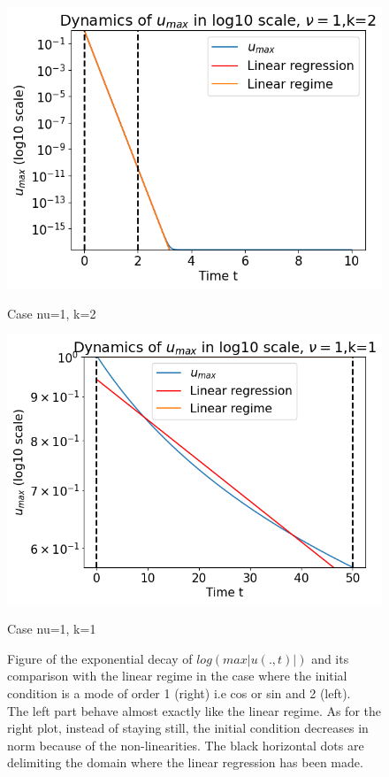 \documentclass[12pt]{article}
\begin{document}
\begin{figure}[htbp]
    \centering
    \begin{minipage}[b]{0.45\textwidth}
        \centering
        \includegraphics[width=\textwidth]{KS_eq/plot_exp_decay.png}
        \caption{Case nu=1, k=2}
        \label{fig:image1}
    \end{minipage}
    \hfill
    \begin{minipage}[b]{0.45\textwidth}
        \centering
        \includegraphics[width=\textwidth]{KS_eq/plot_decay_nu_1_k_1png.png}
        \caption{Case nu=1, k=1}
        \label{fig:image2}
    \end{minipage}
    \caption{Figure of the exponential decay of $log(max|u(.,t)|)$ and its comparison with the linear regime in the case where the initial condition is a mode of order 1 (right) i.e cos or sin and 2 (left). \\
    The left part behave almost exactly like the linear regime. As for the right plot, instead of staying still, the initial condition decreases in norm because of the non-linearities. The black horizontal dots are delimiting the domain where the linear regression has been made.}
    \label{fig:both_images}
\end{figure}
\end{document}
